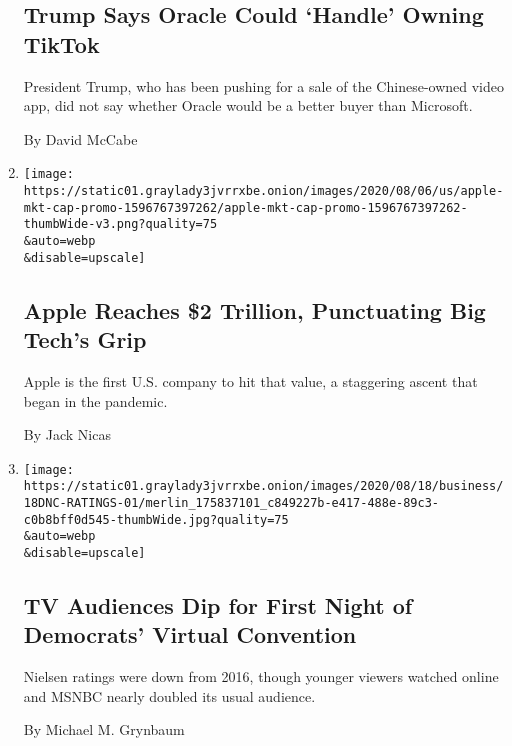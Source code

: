 \begin{enumerate}
{  \subsection{Trump Says Oracle Could `Handle' Owning
  TikTok}\label{trump-says-oracle-could-handle-owning-tiktok}}

  President Trump, who has been pushing for a sale of the Chinese-owned
  video app, did not say whether Oracle would be a better buyer than
  Microsoft.

  By David McCabe
\item
  \href{/2020/08/19/technology/apple-2-trillion.html}{}

  \texttt{[image: https://static01.graylady3jvrrxbe.onion/images/2020/08/06/us/apple-mkt-cap-promo-1596767397262/apple-mkt-cap-promo-1596767397262-thumbWide-v3.png?quality=75\\\&auto=webp\\\&disable=upscale]}

  \hypertarget{apple-reaches-2-trillion-punctuating-big-techs-grip}{%
  \subsection{Apple Reaches \$2 Trillion, Punctuating Big Tech's
  Grip}\label{apple-reaches-2-trillion-punctuating-big-techs-grip}}

  Apple is the first U.S. company to hit that value, a staggering ascent
  that began in the pandemic.

  By Jack Nicas
\item
  \href{/2020/08/18/business/media/democratic-convention-ratings-michelle-obama.html}{}

  \texttt{[image: https://static01.graylady3jvrrxbe.onion/images/2020/08/18/business/18DNC-RATINGS-01/merlin\_175837101\_c849227b-e417-488e-89c3-c0b8bff0d545-thumbWide.jpg?quality=75\\\&auto=webp\\\&disable=upscale]}

  \hypertarget{tv-audiences-dip-for-first-night-of-democrats-virtual-convention}{%
  \subsection{TV Audiences Dip for First Night of Democrats' Virtual
  Convention}\label{tv-audiences-dip-for-first-night-of-democrats-virtual-convention}}

  Nielsen ratings were down from 2016, though younger viewers watched
  online and MSNBC nearly doubled its usual audience.

  By Michael M. Grynbaum
\end{enumerate}

